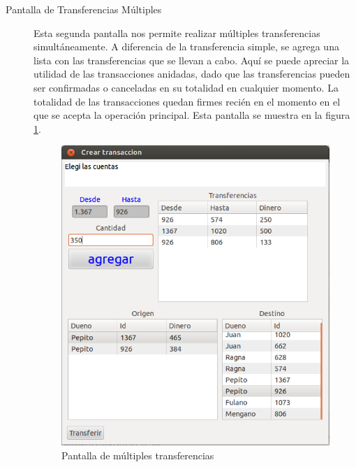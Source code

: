 \begin{description}
		
	\item[Pantalla de Transferencias Múltiples]
		Esta segunda pantalla nos permite realizar múltiples transferencias
		simultáneamente.
		A diferencia de la transferencia simple, se agrega una
		lista con las transferencias que se llevan a cabo.
		Aquí se puede apreciar la utilidad de las transacciones anidadas, dado que
		las transferencias pueden ser confirmadas o canceladas en su totalidad en
		cualquier momento. 
		La totalidad de las transacciones quedan firmes recién en el momento en el 
		que se acepta la operación principal. Esta pantalla se
		muestra en la figura \ref{trasferenciaMultiple}.
	
		\begin{figure}[hbt]
			\centering
			\includegraphics[scale=0.5]{img/multTransferencias}
			\caption{Pantalla de múltiples transferencias }
			\label{trasferenciaMultiple}
		\end{figure}
		
\end{description}